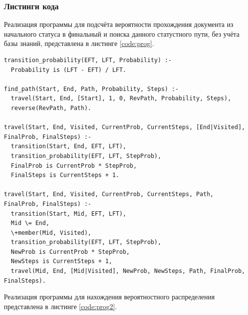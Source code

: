 \subsubsection{Листинги кода}

Реализация программы для подсчёта вероятности прохождения документа из начального статуса в финальный и поиска данного статустного пути, без учёта базы знаний, представлена в листинге \ref{code:prog}.

\clearpage

\begin{lstlisting}[label=code:prog, caption={Реализация поиска пути и вероятности}]
transition_probability(EFT, LFT, Probability) :-
  Probability is (LFT - EFT) / LFT.

find_path(Start, End, Path, Probability, Steps) :-
  travel(Start, End, [Start], 1, 0, RevPath, Probability, Steps),
  reverse(RevPath, Path).

travel(Start, End, Visited, CurrentProb, CurrentSteps, [End|Visited], FinalProb, FinalSteps) :-
  transition(Start, End, EFT, LFT),
  transition_probability(EFT, LFT, StepProb),
  FinalProb is CurrentProb * StepProb,
  FinalSteps is CurrentSteps + 1.

travel(Start, End, Visited, CurrentProb, CurrentSteps, Path, FinalProb, FinalSteps) :-
  transition(Start, Mid, EFT, LFT),
  Mid \= End,
  \+member(Mid, Visited),
  transition_probability(EFT, LFT, StepProb),
  NewProb is CurrentProb * StepProb,
  NewSteps is CurrentSteps + 1,
  travel(Mid, End, [Mid|Visited], NewProb, NewSteps, Path, FinalProb, FinalSteps).
\end{lstlisting}

Реализация программы для нахождения вероятностного распределения представлена в листинге \ref{code:prog2}.

\clearpage

